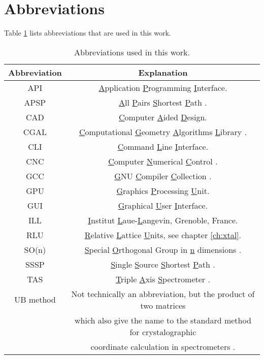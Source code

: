 \section{Abbreviations}
Table \ref{tab:abbreviations} lists abbreviations that are used in this work.

\begin{table}[htb]
	\centering
	\begin{tabular}{|c|c|}
		\hline
		\bf{Abbreviation} & \bf{Explanation} \tabularnewline
		\hline
		API		 & \underline{A}pplication \underline{P}rogramming \underline{I}nterface. \tabularnewline
		\hline
		APSP		 & \underline{A}ll \underline{P}airs \underline{S}hortest \underline{P}ath \cite[pp. 309-320]{Erickson2019}. \tabularnewline
		\hline
		CAD              & \underline{C}omputer \underline{A}ided \underline{D}esign. \tabularnewline
		\hline
		CGAL             & \underline{C}omputational \underline{G}eometry \underline{A}lgorithms \underline{L}ibrary \cite{web_cgal}. \tabularnewline
		\hline
		CLI              & \underline{C}ommand \underline{L}ine \underline{I}nterface. \tabularnewline
		\hline
		CNC              & \underline{C}omputer \underline{N}umerical \underline{C}ontrol \cite{wiki_milling}. \tabularnewline
		\hline
		GCC              & \underline{G}NU \underline{C}ompiler \underline{C}ollection \cite{web_gcc}. \tabularnewline
		\hline
		GPU              & \underline{G}raphics \underline{P}rocessing \underline{U}nit. \tabularnewline
		\hline
		GUI              & \underline{G}raphical \underline{U}ser \underline{I}nterface. \tabularnewline
		\hline
		ILL              & \underline{I}nstitut \underline{L}aue-\underline{L}angevin, Grenoble, France. \tabularnewline
		\hline
		RLU              & \underline{R}elative \underline{L}attice \underline{U}nits, see chapter \ref{ch:xtal}. \tabularnewline
		\hline
		SO(n)            & \underline{S}pecial \underline{O}rthogonal Group in \underline{n} dimensions \cite[pp. 849-851]{Arfken2013}. \tabularnewline
		\hline
		SSSP		 & \underline{S}ingle \underline{S}ource \underline{S}hortest \underline{P}ath \cite[pp. 273-297]{Erickson2019}. \tabularnewline
		\hline
		TAS              & \underline{T}riple \underline{A}xis \underline{S}pectrometer \cite{Shirane2002}. \tabularnewline
		\hline
		UB method        & Not technically an abbreviation, but the product of two matrices \tabularnewline
		                          & which also give the name to the standard method for crystalographic \tabularnewline
		                          & coordinate calculation in spectrometers \cite{Lumsden2005}. \tabularnewline
		\hline
	\end{tabular}
	\caption[Abbreviations.]{Abbreviations used in this work.}
	\label{tab:abbreviations}
\end{table}
